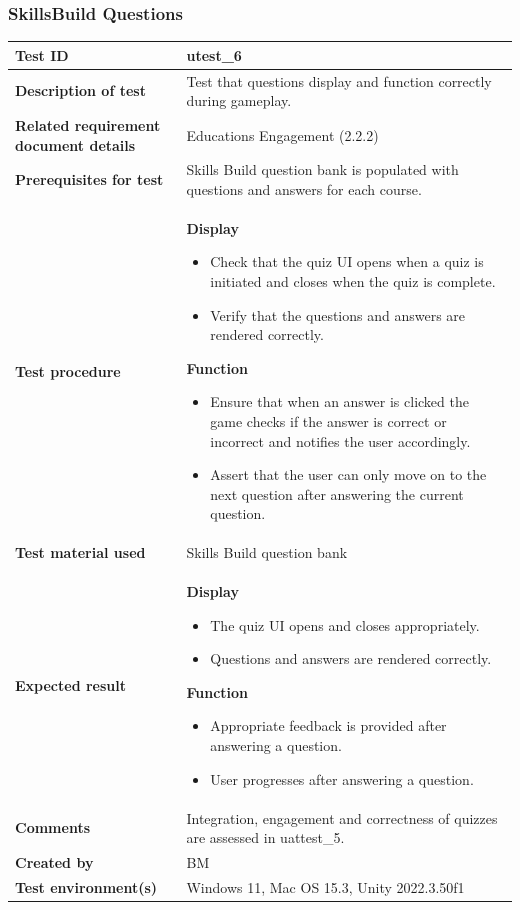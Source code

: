\documentclass[11pt, a4paper]{article}
\begin{document}
\newpage

\subsubsection{SkillsBuild Questions}

\begin{center}
\begin{tabularx}{\linewidth}{|>{\raggedright\arraybackslash}m{4cm}|X|}
    \hline
    \textbf{Test ID} & utest\_6 \\
    \hline
    \textbf{Description of test} & Test that questions display and function correctly during gameplay. \\
    \hline
    \textbf{Related requirement document details} & Educations Engagement (2.2.2) \\
    \hline
    \textbf{Prerequisites for test} & Skills Build question bank is populated with questions and answers for each course. \\
    \hline
    \textbf{Test procedure} &
    \textbf{Display}
    \begin{itemize}
        \item Check that the quiz UI opens when a quiz is initiated and closes when the quiz is complete.
        \item Verify that the questions and answers are rendered correctly.
    \end{itemize}
    \textbf{Function}
    \begin{itemize}
        \item Ensure that when an answer is clicked the game checks if the answer is correct or incorrect and notifies the user accordingly.
        \item Assert that the user can only move on to the next question after answering the current question.
    \end{itemize}
    \\
    \hline
    \textbf{Test material used} & Skills Build question bank \\
    \hline
    \textbf{Expected result} &
    \textbf{Display}
    \begin{itemize}
        \item The quiz UI opens and closes appropriately.
        \item Questions and answers are rendered correctly.
    \end{itemize}
    \textbf{Function}
    \begin{itemize}
        \item Appropriate feedback is provided after answering a question.
        \item User progresses after answering a question.
    \end{itemize}
    \\
    \hline
    \textbf{Comments} & Integration, engagement and correctness of quizzes are assessed in uattest\_5. \\
    \hline
    \textbf{Created by} & BM \\
    \hline
    \textbf{Test environment(s)} & Windows 11, Mac OS 15.3, Unity 2022.3.50f1 \\
    \hline
\end{tabularx}
\end{center}
\end{document}
